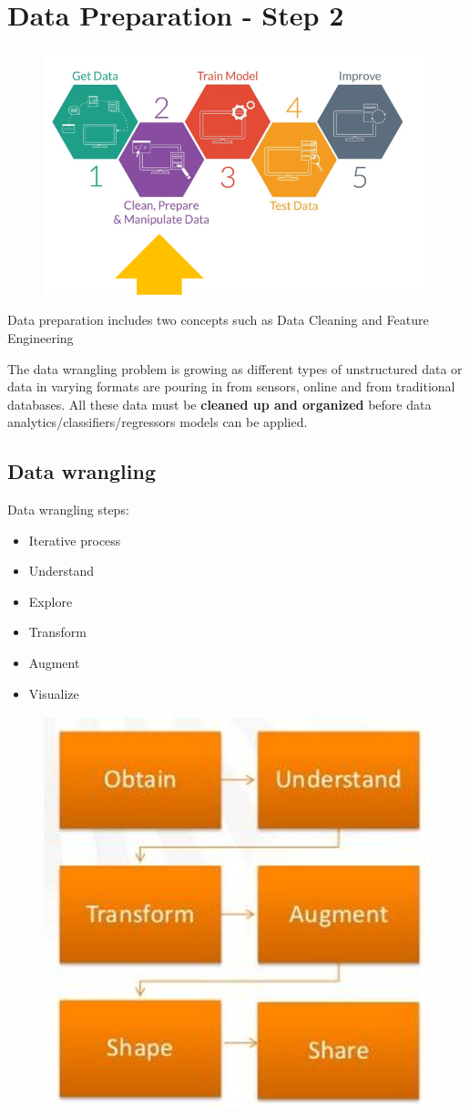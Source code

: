 \section{Data Preparation - Step 2}
\begin{figure}[H]
    \centering
    \includegraphics[width=0.8\linewidth]{07-08/images/step2.png}
\end{figure}

\noindent Data preparation includes two concepts such as Data Cleaning and Feature Engineering

\noindent The data wrangling problem is growing as different types of unstructured data or data in varying formats are pouring in from sensors, online and from traditional databases. 
All these data must be \textbf{cleaned up and organized } before data analytics/classifiers/regressors models can be applied.

\subsection{Data wrangling}
\noindent Data wrangling steps:
\begin{itemize}
    \item Iterative process
    \item Understand
    \item Explore
    \item Transform
    \item Augment
    \item Visualize
\end{itemize}

\begin{figure}[H]
    \centering
    \includegraphics[width=0.6\linewidth]{07-08/images/data wrangling.png}
\end{figure}

